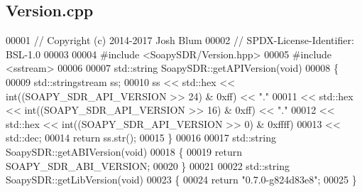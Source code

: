 \subsection{Version.\+cpp}
\label{Version_8cpp_source}

\begin{DoxyCode}
00001 \textcolor{comment}{// Copyright (c) 2014-2017 Josh Blum}
00002 \textcolor{comment}{// SPDX-License-Identifier: BSL-1.0}
00003 
00004 \textcolor{preprocessor}{#include <SoapySDR/Version.hpp>}
00005 \textcolor{preprocessor}{#include <sstream>}
00006 
00007 std::string SoapySDR::getAPIVersion(\textcolor{keywordtype}{void})
00008 \{
00009     std::stringstream ss;
00010     ss << std::hex << int((SOAPY\_SDR\_API\_VERSION >> 24) & 0xff) << \textcolor{stringliteral}{"."}
00011        << std::hex << int((SOAPY\_SDR\_API\_VERSION >> 16) & 0xff) << \textcolor{stringliteral}{"."}
00012        << std::hex << int((SOAPY\_SDR\_API\_VERSION >> 0) & 0xffff)
00013        << std::dec;
00014     \textcolor{keywordflow}{return} ss.str();
00015 \}
00016 
00017 std::string SoapySDR::getABIVersion(\textcolor{keywordtype}{void})
00018 \{
00019     \textcolor{keywordflow}{return} SOAPY_SDR_ABI_VERSION;
00020 \}
00021 
00022 std::string SoapySDR::getLibVersion(\textcolor{keywordtype}{void})
00023 \{
00024     \textcolor{keywordflow}{return} \textcolor{stringliteral}{"0.7.0-g824d83e8"};
00025 \}
\end{DoxyCode}
